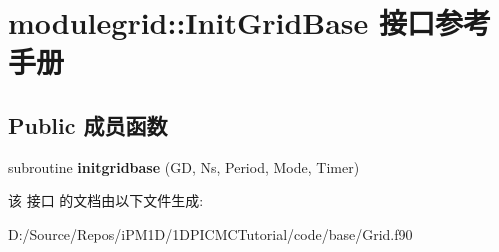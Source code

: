 \hypertarget{interfacemodulegrid_1_1_init_grid_base}{}\section{modulegrid\+::Init\+Grid\+Base 接口参考手册}
\label{interfacemodulegrid_1_1_init_grid_base}
\subsection*{Public 成员函数}
\begin{DoxyCompactItemize}
\item 
\mbox{\label{interfacemodulegrid_1_1_init_grid_base_a8933342cd2ef87779d74816e58586c2e}} 
subroutine {\bfseries initgridbase} (GD, Ns, Period, Mode, Timer)
\end{DoxyCompactItemize}


该 接口 的文档由以下文件生成\+:\begin{DoxyCompactItemize}
\item 
D\+:/\+Source/\+Repos/i\+P\+M1\+D/1\+D\+P\+I\+C\+M\+C\+Tutorial/code/base/Grid.\+f90\end{DoxyCompactItemize}
